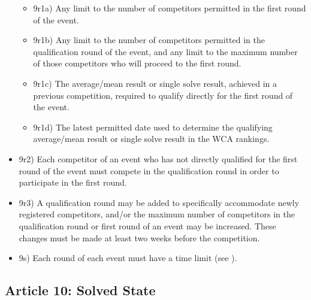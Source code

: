 \begin{itemize}
  \begin{itemize}
  \item
    9r1a) Any limit to the number of competitors permitted in the first
    round of the event.
  \item
    9r1b) Any limit to the number of competitors permitted in the
    qualification round of the event, and any limit to the maximum
    number of those competitors who will proceed to the first round.
  \item
    9r1c) The average/mean result or single solve result, achieved in a
    previous competition, required to qualify directly for the first
    round of the event.
  \item
    9r1d) The latest permitted date used to determine the qualifying
    average/mean result or single solve result in the WCA rankings.
  \end{itemize}
\item
  9r2) Each competitor of an event who has not directly qualified for
  the first round of the event must compete in the qualification round
  in order to participate in the first round.
\item
  9r3) A qualification round may be added to specifically accommodate
  newly registered competitors, and/or the maximum number of competitors
  in the qualification round or first round of an event may be
  increased. These changes must be made at least two weeks before the
  competition.
\item
  9s) Each round of each event must have a time limit (see ).
\end{itemize}

\subsection{ Article 10: Solved State}

